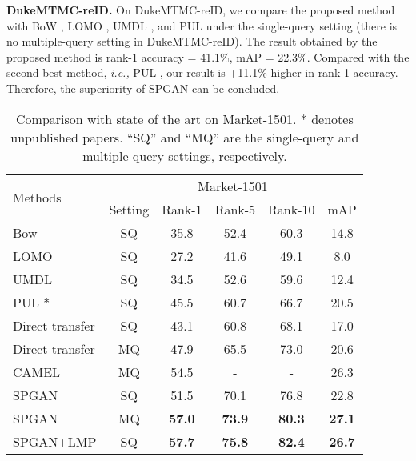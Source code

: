 \documentclass[10pt,twocolumn,letterpaper]{article}
\begin{document}
\textbf{DukeMTMC-reID.} On DukeMTMC-reID, we compare the proposed method with BoW \cite{DBLP:conf/iccv/ZhengSTWWT15}, LOMO \cite{DBLP:conf/cvpr/LiaoHZL15}, UMDL \cite{DBLP:conf/cvpr/PengXWPGHT16}, and PUL \cite{fan17unsupervised} under the single-query setting (there is no multiple-query setting in DukeMTMC-reID). The result obtained by the proposed method is {rank-1 accuracy = 41.1\%, mAP = 22.3\%}. Compared with the second best method, \emph{i.e.,} PUL \cite{fan17unsupervised}, our result is +11.1\% higher in rank-1 accuracy. Therefore, the superiority of SPGAN can be concluded. 
\setlength{\tabcolsep}{3pt}
\begin{table}[t]
\setlength{\abovecaptionskip}{-0.2cm} 
\setlength{\belowcaptionskip}{-0.1cm}
\begin{center}
\begin{tabular}{l|c|cccc}
\hline
\multicolumn{1}{l|}{\multirow{2}{*}{Methods}}&\multicolumn{5}{c}{Market-1501}\\
\cline{2-6}
\multicolumn{1}{c|}{}&Setting&Rank-1&Rank-5&Rank-10&mAP\\
\hline
\hline
Bow \cite{DBLP:conf/iccv/ZhengSTWWT15}&SQ&35.8&52.4&60.3&14.8\\
LOMO \cite{DBLP:conf/cvpr/LiaoHZL15}&SQ&27.2&41.6&49.1&8.0\\
\hline
UMDL \cite{DBLP:conf/cvpr/PengXWPGHT16}&SQ&34.5&52.6&59.6&12.4\\
PUL \cite{fan17unsupervised}*&SQ&45.5&60.7&66.7&20.5\\
Direct transfer &SQ&43.1&60.8&68.1&17.0\\
Direct transfer &MQ& 47.9&65.5&73.0&20.6 \\
CAMEL \cite{CAMEL} &MQ&54.5&-&-&26.3\\
\hline
SPGAN&SQ& 51.5&70.1&76.8& 22.8\\
SPGAN&MQ& \textbf{57.0}&\textbf{73.9}&\textbf{80.3}& \textbf{27.1}\\
{SPGAN+LMP}&SQ&\textbf{57.7}&\textbf{75.8}&\textbf{82.4}&\textbf{26.7}\\
\hline
\end{tabular}
\end{center}
\setlength{\abovecaptionskip}{-0cm} 
\caption{Comparison with  state of the art on Market-1501. * denotes unpublished papers. ``SQ'' and ``MQ'' are the single-query and multiple-query settings, respectively. }
\label{table:sota-market}
\end{table}
\end{document}
